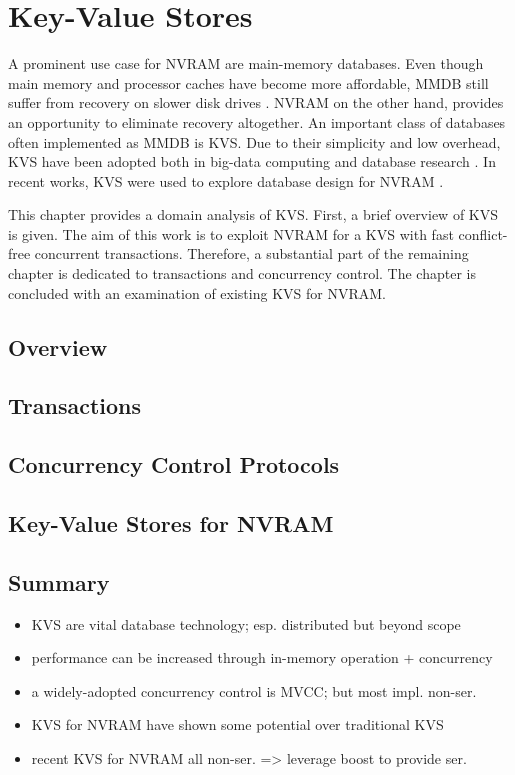\chapter{Key-Value Stores}
\label{ch:kvs}

A prominent use case for NVRAM are main-memory databases. Even though main
memory and processor caches have become more affordable, MMDB still suffer from
recovery on slower disk drives \cite{oukid2015instant, schwalb2016hyrise}. NVRAM
on the other hand, provides an opportunity to eliminate recovery altogether. An
important class of databases often implemented as MMDB is KVS. Due to their
simplicity and low overhead, KVS have been adopted both in big-data computing
and database research \cite{decandia2007dynamo, lakshman2010cassandra,
wang2015hydradb}. In recent works, KVS were used to explore database design for
NVRAM \cite{bailey2013exploring, zhou2016nvht, wu2016nvmcached}.

This chapter provides a domain analysis of KVS. First, a brief overview of KVS
is given. The aim of this work is to exploit NVRAM for a KVS with fast
conflict-free concurrent transactions. Therefore, a substantial part of the
remaining chapter is dedicated to transactions and concurrency control. The
chapter is concluded with an examination of existing KVS for NVRAM.

\section{Overview}


\section{Transactions}


\section{Concurrency Control Protocols}


\section{Key-Value Stores for NVRAM}


\section{Summary}

\begin{itemize}
    \item KVS are vital database technology; esp. distributed but beyond scope
    \item performance can be increased through in-memory operation + concurrency
    \item a widely-adopted concurrency control is MVCC; but most impl. non-ser.
    \item KVS for NVRAM have shown some potential over traditional KVS
    \item recent KVS for NVRAM all non-ser. => leverage boost to provide ser.
\end{itemize}

